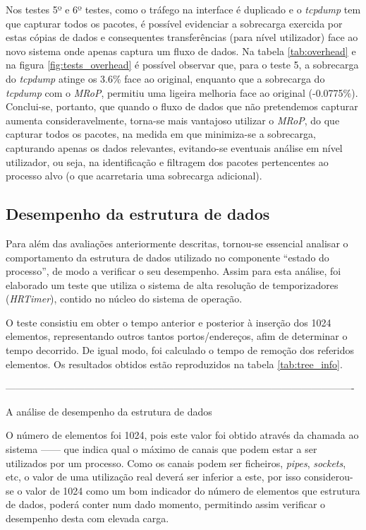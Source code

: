 Nos testes 5º e 6º testes, como o tráfego na interface é duplicado e o \textit{tcpdump} tem que capturar todos os pacotes, é possível evidenciar a sobrecarga exercida por estas cópias de dados e consequentes transferências (para nível utilizador) face ao novo sistema onde apenas captura um fluxo de dados.
Na tabela \ref{tab:overhead} e na figura \ref{fig:tests_overhead} é possível observar que, para o teste 5, a sobrecarga do \textit{tcpdump} atinge os 3.6\% face ao original, enquanto que a sobrecarga do \textit{tcpdump} com o \textit{MRoP}, permitiu uma ligeira melhoria face ao original (-0.0775\%).
Conclui-se, portanto, que quando o fluxo de dados que não pretendemos capturar aumenta consideravelmente, torna-se mais vantajoso utilizar o \textit{MRoP}, do que capturar todos os pacotes, na medida em que minimiza-se a sobrecarga, capturando apenas os dados relevantes, evitando-se eventuais análise em nível utilizador, ou seja, na identificação e filtragem dos pacotes pertencentes ao processo alvo (o que acarretaria uma sobrecarga adicional).

\subsection{Desempenho da estrutura de dados}

Para além das avaliações anteriormente descritas, tornou-se essencial analisar o comportamento da estrutura de dados utilizado no componente “estado do processo”, de modo a verificar o seu desempenho.
Assim para esta análise, foi elaborado um teste que utiliza o sistema de alta resolução de temporizadores (\textit{HRTimer})\cite{hrtimerKernel}, contido no núcleo do sistema de operação.

O teste consistiu em obter o tempo anterior e posterior à inserção dos 1024 elementos, representando outros tantos portos/endereços, afim de determinar o tempo decorrido.
De igual modo, foi calculado o tempo de remoção dos referidos elementos. Os resultados obtidos estão reproduzidos na tabela \ref{tab:tree_info}.


----------------------------------------------------------------------------------------------------------

A análise de desempenho da estrutura de dados

O número de elementos foi 1024, pois este valor foi obtido através da chamada ao sistema ------ que indica qual o máximo de canais que podem estar a ser utilizados por um processo.
Como os canais podem ser ficheiros, \textit{pipes}, \textit{sockets}, etc, o valor de uma utilização real deverá ser inferior a este, por isso considerou-se o valor de 1024 como um bom indicador do número de elementos que estrutura de dados, poderá conter num dado momento, permitindo assim verificar o desempenho desta com elevada carga.


